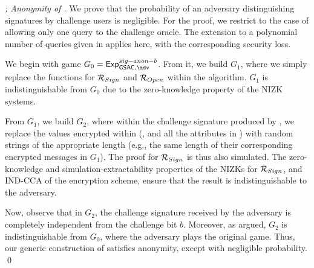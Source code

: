 \begin{proof}[; Anonymity of \GSACGen]
  We prove that the probability of an adversary distinguishing signatures by
  challenge users is negligible. For the proof, we restrict to the case of
  allowing only one query to the challenge oracle. The extension to a polynomial
  number of queries given in \cite{bsz05} applies here, with the corresponding
  security loss.

  We begin with game $G_0=\ExpGSACSigAnonb$. From it, we build $G_1$, where we
  simply replace the \NIZKSetup functions for $\mathcal{R}_{Sign}$ and
  $\mathcal{R}_{Open}$ within the \Setup algorithm. $G_1$ is indistinguishable
  from $G_0$ due to the zero-knowledge property of the NIZK systems.

  From $G_1$, we build $G_2$, where within the challenge signature produced by
  \CHALb, we replace the values encrypted within \Sign (\Ccom, and all the
  attributes in \attrs) with random strings of the appropriate length (e.g.,
  the same length of their corresponding encrypted messages in $G_1$). The
  proof for $\mathcal{R}_{Sign}$ is thus
  also simulated. The zero-knowledge and simulation-extractability properties
  of the NIZKs for $\mathcal{R}_{Sign}$, and IND-CCA of the encryption
  scheme, ensure that the result is indistinguishable to the adversary.

  Now, observe that in $G_2$, the challenge signature received by the adversary
  is completely independent from the challenge bit $b$. Moreover, as argued,
  $G_2$ is indistinguishable from $G_0$, where the adversary plays the original
  \ExpGSACSigAnonb game. Thus, our generic construction of \GSAC satisfies
  anonymity, except with negligible probability.
  \qed
\end{proof}

